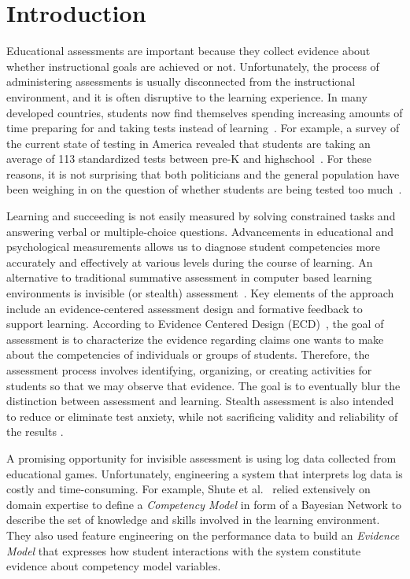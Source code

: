\documentclass{sigchi}
\begin{document}
{}

\section{Introduction}
Educational assessments are important because they collect evidence about  whether instructional goals are achieved or not.
Unfortunately, the process of  administering assessments is usually disconnected from the instructional environment, and  it is often  disruptive to the learning experience. 
In many developed countries, students now find themselves spending increasing amounts of time preparing for and taking tests instead of learning~\cite{hofman2015re}.
For example, a  survey of the current state of testing in America revealed that students are taking an average of 113 standardized tests between pre-K and highschool~\cite{lazarin2014testing}. 
For these reasons, it is not surprising that both politicians and the general population have been weighing in on the question of whether students are being tested too much~\cite{lazarin2014testing}.

Learning and succeeding is not easily measured by solving constrained tasks and answering verbal or multiple-choice questions.
Advancements in educational and psychological measurements allows us to diagnose student competencies more accurately and effectively at various levels during the course of learning.
An alternative to traditional summative assessment in computer based learning environments is invisible (or stealth) assessment~\cite{shute2013stealth}.
Key elements of the approach include an evidence-centered assessment design and formative feedback to support learning.
According to Evidence Centered Design (ECD)~\cite{mislevy2012design}, the goal of assessment is to characterize the evidence regarding claims one wants to make about the competencies of individuals or groups of students.
Therefore, the assessment process involves identifying, organizing, or creating activities for students so that we may observe that evidence.
The goal is to eventually blur the distinction between assessment and learning.
Stealth assessment is also intended to reduce or eliminate test anxiety, while not sacrificing validity and reliability of the results \cite{shute2008you}.

A promising opportunity for invisible assessment is using log data collected from educational games.
Unfortunately, engineering a system that interprets log data is costly and time-consuming.
For example, Shute et al.~\cite{shute2013stealth, shute2009melding} relied extensively on domain expertise to define a \textit{Competency Model} in form of a Bayesian Network to describe the set of knowledge and skills involved in the learning environment.
They also used feature engineering on the performance data to build an \textit{Evidence Model} that expresses how student interactions with the system constitute evidence about competency model variables.
\end{document}
